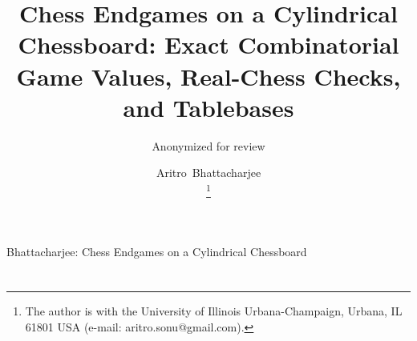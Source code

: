 \documentclass[journal]{IEEEtran}
\newif\ifsubmitted
\theoremstyle{ieeeplain}
\theoremstyle{ieeedef}
\begin{document}
\title{Chess Endgames on a Cylindrical Chessboard: Exact Combinatorial Game Values, Real-Chess Checks,
and Tablebases}

\ifdefined\anonbuild
\author{Anonymized for review}
\else
\ifsubmitted
  \newcommand{\ieeenotice}{\thanks{This work has been submitted to the IEEE for possible publication.
    Copyright may be transferred without notice, after which this version may no longer be accessible.}}
\else
  \newcommand{\ieeenotice}{}
\fi
\author{Aritro~Bhattacharjee%
\ieeenotice
\thanks{The author is with the University of Illinois Urbana-Champaign, Urbana, IL 61801 USA (e-mail: aritro.sonu@gmail.com).}}
%
{Bhattacharjee: Chess Endgames on a Cylindrical Chessboard}
\fi

\maketitle



\ifdefined\anonbuild\else
\begingroup
\makeatletter
\footnotesize
\setcounter{tocdepth}{1}
\renewcommand{\l@section}[2]{\par\noindent\hangindent 2.4em #1\nobreak\hfill #2\par}
\renewcommand{\numberline}[1]{\makebox[2.4em][l]{#1}}
\section*{\contentsname}
\vspace{-0.4\baselineskip}
\makeatother
\endgroup
\vspace{0.3\baselineskip}
\fi

















\raggedbottom
\appendix[Positions]

\end{document}
